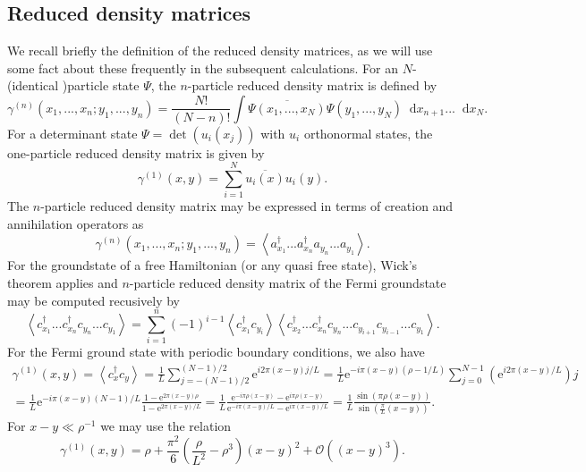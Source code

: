 \documentclass[a4paper,11pt]{article}
\newcommand{\euler}[1]{\text{e}^{#1}}
\renewcommand{\braket}[1]{\left\langle#1\right\rangle}
\newcommand*\diff{\mathop{}\!\mathrm{d}}
\numberwithin{equation}{section}
\begin{document}
	\subsection{Reduced density matrices}
	We recall briefly the definition of the reduced density matrices, as we will use some fact about these frequently in the subsequent calculations.
	For an $ N $-(identical )particle state $ \Psi $, the $ n $-particle reduced density matrix is defined by \begin{equation}
	\gamma^{(n)}(x_1,...,x_n;y_1,...,y_n)=\frac{N!}{(N-n)!}\int \overline{\Psi(x_1,...,x_N)}\Psi(y_1,...,y_N)\diff x_{n+1}...\diff x_N.
	\end{equation}
	For a determinant state $ \Psi=\det\left(u_i(x_j)\right) $ with $ u_i $ orthonormal states, the one-particle reduced density matrix is given by \begin{equation}
	\gamma^{(1)}(x,y)=\sum_{i=1}^{N} \overline{u_i(x)}u_i(y).
	\end{equation} 
	The $ n $-particle reduced density matrix may be expressed in terms of creation and annihilation operators as \begin{equation}
	\gamma^{(n)}(x_1,...,x_n;y_1,...,y_n)=\braket{a^\dagger_{x_1}...a^\dagger_{x_n}a_{y_n}...a_{y_1}}.
	\end{equation}
	For the groundstate of a free Hamiltonian (or any quasi free state), Wick's theorem applies and $ n $-particle reduced density matrix of the Fermi groundstate may be computed recusively by \begin{equation}
	\braket{c^\dagger_{x_1}...c^\dagger_{x_n}c_{y_n}...c_{y_1}}=\sum_{i=1}^{n}(-1)^{i-1}\braket{c^\dagger_{x_1}c_{y_i}}\braket{c^\dagger_{x_2}...c^\dagger_{x_n}c_{y_n}...c_{y_{i+1}}c_{y_{i-1}}...c_{y_1}}.
	\end{equation}
	For the Fermi ground state with periodic boundary conditions, we also have \begin{equation}
	\begin{aligned}
	\gamma^{(1)}(x,y)=\braket{c^\dagger_{x}c_{y}}=\frac{1}{L}\sum_{j=-(N-1)/2}^{(N-1)/2}\euler{i2\pi(x-y)j/L}=\frac{1}{L}\euler{-i\pi(x-y)(\rho-1/L)}\sum_{j=0}^{N-1}\left(\euler{i2\pi(x-y)/L}\right){j}\\=\frac{1}{L}\euler{-i\pi(x-y)(N-1)/L}\frac{1-\euler{2\pi(x-y)\rho}}{1-\euler{2\pi(x-y)/L}}=\frac{1}{L}\frac{\euler{-i\pi\rho(x-y)}-\euler{i\pi\rho(x-y)}}{\euler{-i\pi(x-y)/L}-\euler{i\pi(x-y)/L}}=\frac{1}{L}\frac{\sin(\pi\rho(x-y))}{\sin\left(\frac{\pi}{L}(x-y)\right)}.
	\end{aligned}
	\end{equation}
	For $ x-y\ll\rho^{-1} $ we may use the relation \begin{equation}
	\gamma^{(1)}(x,y)=\rho+\frac{\pi^2}{6}\left(\frac{\rho}{L^2}-\rho^3\right)(x-y)^2+\mathcal{O}((x-y)^3).
	\end{equation}
\end{document}
